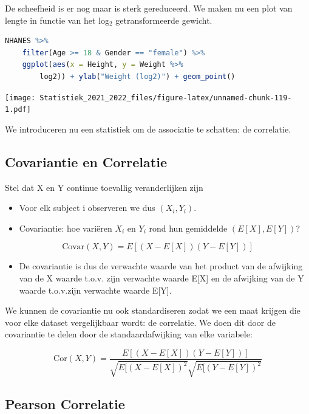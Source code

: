 \documentclass[
  12pt,dutch,coursenotes]{book}
\providecommand{\tightlist}{%
  \setlength{\itemsep}{0pt}\setlength{\parskip}{0pt}}
\theoremstyle{definition}
\theoremstyle{definition}
\theoremstyle{definition}
\theoremstyle{definition}
\theoremstyle{remark}
\begin{document}
De scheefheid is er nog maar is sterk gereduceerd. We maken nu een plot van lengte in functie van het log\(_2\) getransformeerde gewicht.

\begin{lstlisting}[language=R]
NHANES %>%
    filter(Age >= 18 & Gender == "female") %>%
    ggplot(aes(x = Height, y = Weight %>%
        log2)) + ylab("Weight (log2)") + geom_point()
\end{lstlisting}

\texttt{[image: Statistiek\_2021\_2022\_files/figure-latex/unnamed-chunk-119-1.pdf]}

We introduceren nu een statistiek om de associatie te schatten: de correlatie.

\hypertarget{covariantie-en-correlatie}{%
\subsection{Covariantie en Correlatie}\label{covariantie-en-correlatie}}

Stel dat X en Y continue toevallig veranderlijken zijn

\begin{itemize}
\tightlist
\item
  Voor elk subject i observeren we dus \((X_i,Y_i)\).
\item
  Covariantie: hoe variëren \(X_i\) en \(Y_i\) rond hun gemiddelde \((E[X],E[Y])\)?
\end{itemize}

\[\mbox{Covar}(X,Y)=E[(X-E[X])(Y-E[Y])]\]

\begin{itemize}
\tightlist
\item
  De covariantie is dus de verwachte waarde van het product van de afwijking van de X waarde t.o.v. zijn verwachte waarde E{[}X{]} en de afwijking van de Y waarde t.o.v.zijn verwachte waarde E{[}Y{]}.
\end{itemize}

We kunnen de covariantie nu ook standardiseren zodat we een maat krijgen die voor elke dataset vergelijkbaar wordt: de correlatie. We doen dit door de covariantie te delen door de standaardafwijking van elke variabele:

\[\mbox{Cor}(X,Y)=\frac{E[(X-E[X])(Y-E[Y])]}{\sqrt{E[(X-E[X])^2}\sqrt{E[(Y-E[Y])^2}}\]

\hypertarget{pearson-correlatie}{%
\subsection{Pearson Correlatie}\label{pearson-correlatie}}
\end{document}
